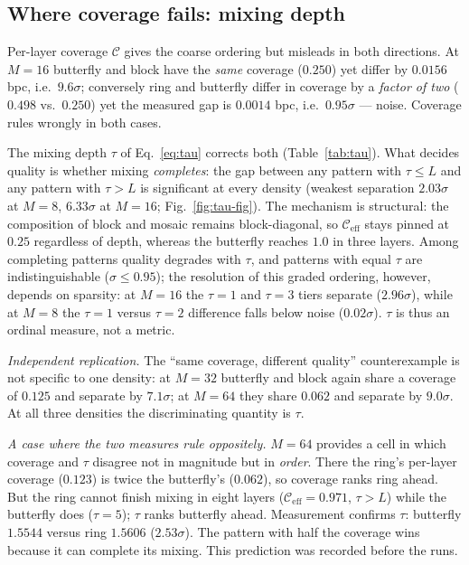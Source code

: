 \documentclass[10pt,journal]{IEEEtran}
\begin{document}
\subsection{Where coverage fails: mixing depth}
\label{sec:tau-result}
Per-layer coverage $\mathcal{C}$ gives the coarse ordering but misleads in both directions. At
$M{=}16$ butterfly and block have the \emph{same} coverage ($0.250$) yet differ by $0.0156$ bpc,
i.e.\ $9.6\sigma$; conversely ring and butterfly differ in coverage by a \emph{factor of two}
($0.498$ vs.\ $0.250$) yet the measured gap is $0.0014$ bpc, i.e.\ $0.95\sigma$ --- noise.
Coverage rules wrongly in both cases.

The mixing depth $\tau$ of Eq.~\eqref{eq:tau} corrects both (Table~\ref{tab:tau}). What decides
quality is whether mixing \emph{completes}: the gap between any pattern with $\tau \le L$ and
any pattern with $\tau > L$ is significant at every density (weakest separation $2.03\sigma$ at
$M{=}8$, $6.33\sigma$ at $M{=}16$; Fig.~\ref{fig:tau-fig}). The mechanism is structural: the composition of block and
mosaic remains block-diagonal, so $\mathcal{C}_{\mathrm{eff}}$ stays pinned at $0.25$ regardless
of depth, whereas the butterfly reaches $1.0$ in three layers. Among completing patterns quality
degrades with $\tau$, and patterns with equal $\tau$ are indistinguishable ($\sigma \le 0.95$);
the resolution of this graded ordering, however, depends on sparsity: at $M{=}16$ the
$\tau{=}1$ and $\tau{=}3$ tiers separate ($2.96\sigma$), while at $M{=}8$ the $\tau{=}1$ versus
$\tau{=}2$ difference falls below noise ($0.02\sigma$). $\tau$ is thus an ordinal measure, not
a metric.

\emph{Independent replication.} The ``same coverage, different quality'' counterexample is not
specific to one density: at $M{=}32$ butterfly and block again share a coverage of $0.125$ and
separate by $7.1\sigma$; at $M{=}64$ they share $0.062$ and separate by $9.0\sigma$. At all
three densities the discriminating quantity is $\tau$.

\emph{A case where the two measures rule oppositely.} $M{=}64$ provides a cell in which
coverage and $\tau$ disagree not in magnitude but in \emph{order}. There the ring's per-layer
coverage ($0.123$) is twice the butterfly's ($0.062$), so coverage ranks ring ahead. But the
ring cannot finish mixing in eight layers ($\mathcal{C}_{\mathrm{eff}}{=}0.971$, $\tau>L$) while
the butterfly does ($\tau{=}5$); $\tau$ ranks butterfly ahead. Measurement confirms $\tau$:
butterfly $1.5544$ versus ring $1.5606$ ($2.53\sigma$). The pattern with half the coverage wins
because it can complete its mixing. This prediction was recorded before the runs.
\end{document}
